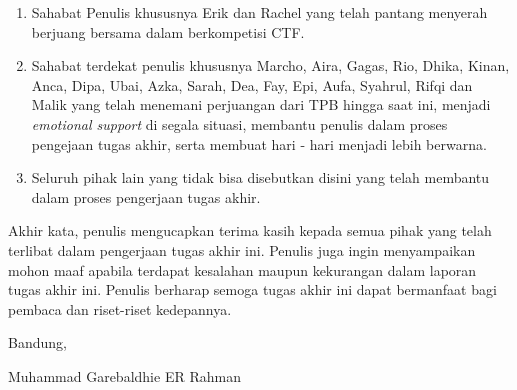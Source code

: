 \begin{enumerate}
  \item Sahabat Penulis khususnya Erik dan Rachel yang telah pantang menyerah berjuang bersama dalam berkompetisi CTF.
  \item Sahabat terdekat penulis khususnya Marcho, Aira, Gagas, Rio, Dhika, Kinan, Anca, Dipa, Ubai, Azka, Sarah, Dea, Fay, Epi, Aufa, Syahrul, Rifqi dan Malik yang telah menemani perjuangan dari TPB hingga saat ini, menjadi \textit{emotional support} di segala situasi, membantu penulis dalam proses pengejaan tugas akhir, serta membuat hari - hari menjadi lebih berwarna.
  \item Seluruh pihak lain yang tidak bisa disebutkan disini yang telah membantu dalam proses pengerjaan tugas akhir.
\end{enumerate}

Akhir kata, penulis mengucapkan terima kasih kepada semua pihak yang telah terlibat dalam pengerjaan tugas akhir ini. Penulis juga ingin menyampaikan mohon maaf apabila terdapat kesalahan maupun kekurangan dalam laporan tugas akhir ini. Penulis berharap semoga tugas akhir ini dapat bermanfaat bagi pembaca dan riset-riset kedepannya.

\begin{flushright}
  \vspace{0.5cm}
  Bandung, \tanggalpengesahan
  
  
  \vspace{1.5cm}
  
  Muhammad Garebaldhie ER Rahman
\end{flushright}